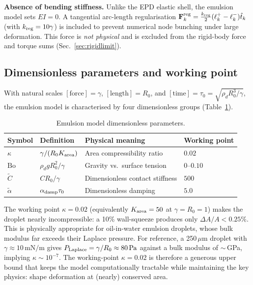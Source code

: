 \documentclass[aps,pre,twocolumn,floatfix,longbibliography]{revtex4-2}
\begin{document}
\textbf{Absence of bending stiffness.}  Unlike the EPD elastic shell, the emulsion model
sets $EI = 0$.  A tangential arc-length regularisation
$\mathbf{F}_k^{\rm reg} = \tfrac{k_{\rm reg}}{2}(\ell_k^+ - \ell_k^-)\hat{t}_k$
(with $k_{\rm reg} = 10\gamma$) is included to prevent numerical node bunching under
large deformation.  This force is \emph{not physical} and is excluded from the
rigid-body force and torque sums (Sec.~\ref{sec:rigidlimit}).

\subsection{Dimensionless parameters and working point}
\label{sec:emulsion_dimless}

With natural scales $[\text{force}] = \gamma$, $[\text{length}] = R_0$, and
$[\text{time}] = \tau_0 = \sqrt{\rho_d R_0^3/\gamma}$, the emulsion model is
characterised by four dimensionless groups (Table~\ref{tab:emulsion_params}).

\begin{table}[htb]
\caption{Emulsion model dimensionless parameters.}
\label{tab:emulsion_params}
\begin{ruledtabular}
\begin{tabular}{llll}
  Symbol & Definition & Physical meaning & Working point \\
\hline
  $\kappa$ & $\gamma/(R_0 K_{\rm area})$ & Area compressibility ratio & $0.02$ \\
  $\mathrm{Bo}$ & $\rho_d g R_0^2/\gamma$ & Gravity vs.\ surface tension & $0$--$0.10$ \\
  $\tilde{C}$ & $C R_0/\gamma$ & Dimensionless contact stiffness & $500$ \\
  $\tilde{\alpha}$ & $\alpha_{\rm damp} \tau_0$ & Dimensionless damping & $5.0$ \\
\end{tabular}
\end{ruledtabular}
\end{table}

The working point $\kappa = 0.02$ (equivalently $K_{\rm area} = 50$ at $\gamma=R_0=1$)
makes the droplet nearly incompressible: a 10\% wall-squeeze produces only $\Delta A/A < 0.25\%$.
This is physically appropriate for oil-in-water emulsion droplets, whose bulk modulus
far exceeds their Laplace pressure.  For reference, a 250\,$\mu$m droplet with
$\gamma \approx 10\,\text{mN/m}$ gives $P_{\rm Laplace} = \gamma/R_0 \approx 80\,\text{Pa}$
against a bulk modulus of $\sim$\,GPa, implying $\kappa \sim 10^{-7}$.  The
working-point $\kappa = 0.02$ is therefore a generous upper bound that keeps the model
computationally tractable while maintaining the key physics: shape deformation at
(nearly) conserved area.
\end{document}
